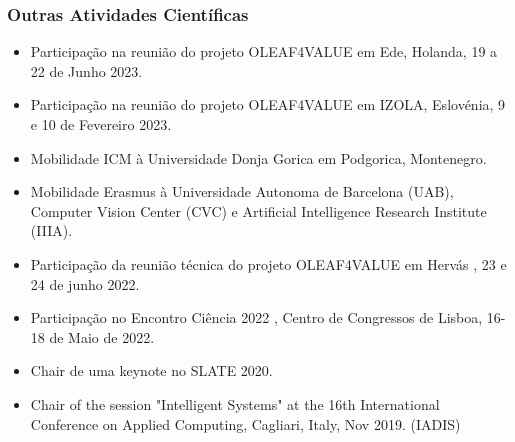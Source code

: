 \documentclass[11pt]{article}
\begin{document}
\subsubsection{Outras Atividades Científicas} 
\begin{itemize}

\item {Participação na reunião do projeto OLEAF4VALUE em Ede, Holanda, 19 a 22 de Junho 2023.}
\item {Participação na reunião do projeto OLEAF4VALUE em IZOLA, Eslovénia, 9 e 10 de Fevereiro 2023.}
\item {Mobilidade ICM à Universidade Donja Gorica em Podgorica, Montenegro.}
\item {Mobilidade Erasmus à Universidade Autonoma de Barcelona (UAB),  Computer Vision Center (CVC) e Artificial Intelligence Research Institute (IIIA).}
\item {Participação da reunião técnica do projeto OLEAF4VALUE em Hervás , 23 e 24 de junho 2022.}
\item {Participação no Encontro Ciência 2022 , Centro de Congressos de Lisboa, 16-18 de Maio de 2022.}
\item {Chair de uma keynote no SLATE 2020.}
\item {Chair of the session "Intelligent Systems" at the 16th International Conference on Applied Computing, Cagliari, Italy, Nov 2019. (IADIS)}


\end{itemize}
\end{document}
